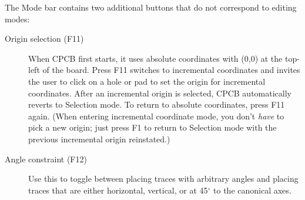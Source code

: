\documentclass[11pt]{report}
\begin{document}
The Mode bar contains two additional buttons that do not correspond to
editing modes:
\begin{description}
      \item[Origin selection (F11)] When CPCB first starts, it uses
        absolute coordinates with (0,0) at the top-left of the
        board. Press F11 switches to incremental coordinates and
        invites the user to click on a hole or pad to set the
        origin for incremental coordinates. After an incremental
        origin is selected, CPCB automatically reverts to
        Selection mode. To return to absolute coordinates, press
        F11 again. (When entering incremental coordinate mode,
        you don't \emph{have} to pick a new origin; just press
        F1 to return to Selection mode with the previous
        incremental origin reinstated.)
      \item[Angle constraint (F12)] Use this to toggle between placing
        traces with arbitrary angles and placing traces that are
        either horizontal, vertical, or at 45$^\circ$ to the canonical
        axes.
\end{description}
\end{document}
